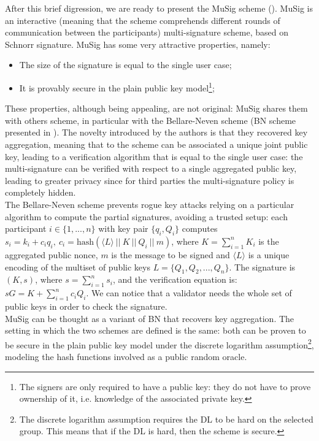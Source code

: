 \bigskip
\noindent
After this brief digression, we are ready to present the MuSig scheme (\cite{RefWork:11}). MuSig is an interactive (meaning that the scheme comprehends different rounds of communication between the participants) multi-signature scheme, based on Schnorr signature. MuSig has some very attractive properties, namely:
\begin{itemize}
	\item The size of the signature is equal to the single user case;
	\item It is provably secure in the plain public key model\footnote{The signers are only required to have a public key: they do not have to prove ownership of it, i.e. knowledge of the associated private key.};
\end{itemize}
These properties, although being appealing, are not original: MuSig shares them with others scheme, in particular with the Bellare-Neven scheme (BN scheme presented in \cite{RefWork:10}). The novelty introduced by the authors is that they recovered key aggregation, meaning that to the scheme can be associated a unique joint public key, leading to a verification algorithm that is equal to the single user case: the multi-signature can be verified with respect to a single aggregated public key, leading to greater privacy since for third parties the multi-signature policy is completely hidden.
\\
The Bellare-Neven scheme prevents rogue key attacks relying on a particular algorithm to compute the partial signatures, avoiding a trusted setup: each participant $i \in \{1, ..., n\}$ with key pair $\{q_i, Q_i\}$ computes $s_i = k_i + c_iq_i, \ c_i = \text{hash}(\langle L \rangle\ || \ K \ || \ Q_i \ || \ m)$, where $K = \sum_{i = 1}^{n}K_i$ is the aggregated public nonce, $m$ is the message to be signed and $\langle L \rangle$ is a unique encoding of the multiset of public keys $L = \{Q_1, Q_2, ..., Q_n\}$. The signature is $(K, s)$, where $s = \sum_{i = 1}^{n}s_i$, and the verification equation is: $sG = K + \sum_{i = 1}^{n}c_iQ_i$. We can notice that a validator needs the whole set of public keys in order to check the signature. 
\\
MuSig can be thought as a variant of BN that recovers key aggregation. The setting in which the two schemes are defined is the same: both can be proven to be secure in the plain public key model under the discrete logarithm assumption\footnote{The discrete logarithm assumption requires the DL to be hard on the selected group. This means that if the DL is hard, then the scheme is secure.}, modeling the hash functions involved as a public random oracle.
